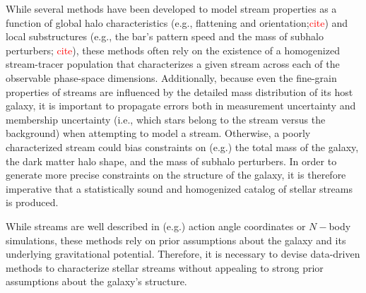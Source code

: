 \documentclass[twocolumn]{aastex631}
\newcommand{\TODO}[1]{{\textcolor{red}{#1}}}
\newcommand{\JN}[1]{\TODO{#1}}
\begin{document}
    While several methods have been developed to model stream properties as a
    function of global halo characteristics (e.g., flattening and
    orientation;\JN{cite}) and local substructures (e.g., the bar's pattern
    speed and the mass of subhalo perturbers; \JN{cite}), these methods often
    rely on the existence of a homogenized stream-tracer population that
    characterizes a given stream across each of the observable phase-space
    dimensions. Additionally, because even the fine-grain properties of streams
    are influenced by the detailed mass distribution of its host galaxy, it is
    important to propagate errors both in measurement uncertainty and membership
    uncertainty (i.e., which stars belong to the stream versus the background)
    when attempting to model a stream. Otherwise, a poorly characterized stream
    could bias constraints on (e.g.) the total mass of the galaxy, the dark
    matter halo shape, and the mass of subhalo perturbers. In order to generate
    more precise constraints on the structure of the galaxy, it is therefore
    imperative that a statistically sound and homogenized catalog of stellar
    streams is produced. 

    While streams are well described in (e.g.) action angle coordinates or
    $N-$body simulations, these methods rely on prior assumptions about the
    galaxy and its underlying gravitational potential. Therefore, it is
    necessary to devise data-driven methods to characterize stellar streams
    without appealing to strong prior assumptions about the galaxy's structure. 
    
\end{document}
